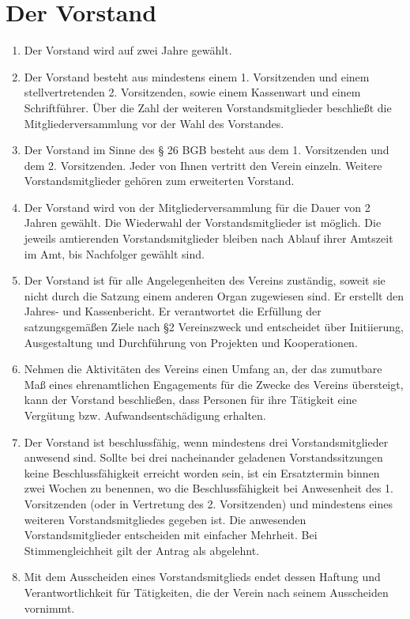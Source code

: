 \section{Der Vorstand}
\begin{enumerate}
  \item Der Vorstand wird auf zwei Jahre gewählt.
  \item Der Vorstand besteht aus mindestens einem 1. Vorsitzenden und einem stellvertretenden 2. Vorsitzenden, sowie einem Kassenwart und einem Schriftführer. Über die Zahl der weiteren Vorstandsmitglieder beschließt die Mitgliederversammlung vor der Wahl des Vorstandes.
  \item Der Vorstand im Sinne des § 26 BGB besteht aus dem 1. Vorsitzenden und dem 2. Vorsitzenden. Jeder von Ihnen vertritt den Verein einzeln. Weitere Vorstandsmitglieder gehören zum erweiterten Vorstand.
  \item Der Vorstand wird von der Mitgliederversammlung für die Dauer von 2 Jahren gewählt. Die Wiederwahl der Vorstandsmitglieder ist möglich. Die jeweils amtierenden Vorstandsmitglieder bleiben nach Ablauf ihrer Amtszeit im Amt, bis Nachfolger gewählt sind.
  \item Der Vorstand ist für alle Angelegenheiten des Vereins zuständig, soweit sie nicht durch die Satzung einem anderen Organ zugewiesen sind. Er erstellt den Jahres- und Kassenbericht. Er verantwortet die Erfüllung der satzungsgemäßen Ziele nach §2 Vereinszweck und entscheidet über Initiierung, Ausgestaltung und Durchführung von Projekten und Kooperationen.
  \item Nehmen die Aktivitäten des Vereins einen Umfang an, der das zumutbare Maß eines ehrenamtlichen Engagements für die Zwecke des Vereins übersteigt, kann der Vorstand beschließen, dass Personen für ihre Tätigkeit eine Vergütung bzw. Aufwandsentschädigung erhalten.
  \item Der Vorstand ist beschlussfähig, wenn mindestens drei Vorstandsmitglieder anwesend sind. Sollte bei drei nacheinander geladenen Vorstandssitzungen keine Beschlussfähigkeit erreicht worden sein, ist ein Ersatztermin binnen zwei Wochen zu benennen, wo die Beschlussfähigkeit bei Anwesenheit des 1. Vorsitzenden (oder in Vertretung des 2. Vorsitzenden) und mindestens eines weiteren Vorstandsmitgliedes gegeben ist. Die anwesenden Vorstandsmitglieder entscheiden mit einfacher Mehrheit. Bei Stimmengleichheit gilt der Antrag als abgelehnt.
  \item Mit dem Ausscheiden eines Vorstandsmitglieds endet dessen Haftung und Verantwortlichkeit für Tätigkeiten, die der Verein nach seinem Ausscheiden vornimmt.

\end{enumerate}
